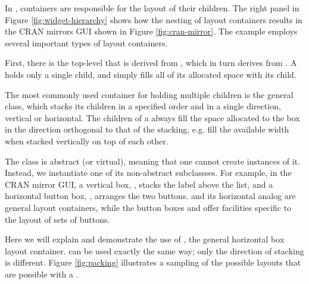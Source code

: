 \documentclass[article,shortnames]{jss}
\begin{document}
In , containers are responsible for the layout of their
children. The right panel in Figure \ref{fig:widget-hierarchy} shows
how the nesting of layout containers results in the CRAN mirrors GUI
shown in Figure \ref{fig:cran-mirror}. The example employs several
important types of  layout containers. 

First, there is the
top-level  that is derived from , which
in turn derives from .  A  holds only
a single child, and  simply fills all of its allocated
space with its child. 

The most commonly used container for holding
multiple children is the general  class, which stacks its
children in a specified order and in a single direction, vertical or
horizontal. The children of a  always fill the space
allocated to the box in the direction orthogonal to that of the
stacking, e.g. fill the available width when stacked vertically on top
of each other. 

The  class is abstract (or virtual), meaning
that one cannot create instances of it. Instead, we instantiate one of
its non-abstract subclassses.  For example, in the CRAN mirror GUI, a
vertical box, , stacks the label above the list, and a
horizontal button box, , arranges the two
buttons.  and its horizontal analog  are
general
layout containers, while the button boxes 
and  offer facilities specific to the layout of
sets of buttons.

Here we will explain and demonstrate the use of , the
general horizontal box layout container.  can be used
exactly the same way; only the direction of stacking is different.
Figure \ref{fig:packing} illustrates a sampling of the possible
layouts that are possible with a .
\end{document}
